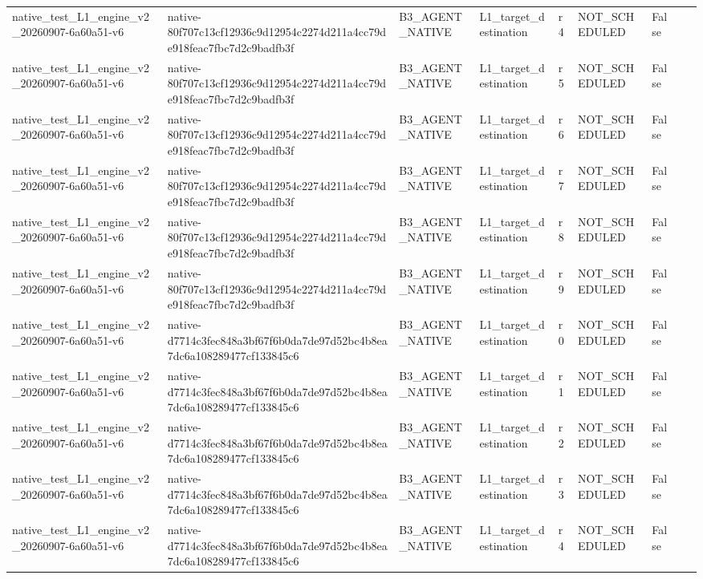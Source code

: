 \begin{tabular}{lllllllll}
native\_test\_L1\_engine\_v2\_20260907-6a60a51-v6 & native-80f707c13cf12936c9d12954c2274d211a4cc79de918feac7fbc7d2c9badfb3f & B3\_AGENT\_NATIVE & L1\_target\_destination & r4 & NOT\_SCHEDULED & False &  &  \\
native\_test\_L1\_engine\_v2\_20260907-6a60a51-v6 & native-80f707c13cf12936c9d12954c2274d211a4cc79de918feac7fbc7d2c9badfb3f & B3\_AGENT\_NATIVE & L1\_target\_destination & r5 & NOT\_SCHEDULED & False &  &  \\
native\_test\_L1\_engine\_v2\_20260907-6a60a51-v6 & native-80f707c13cf12936c9d12954c2274d211a4cc79de918feac7fbc7d2c9badfb3f & B3\_AGENT\_NATIVE & L1\_target\_destination & r6 & NOT\_SCHEDULED & False &  &  \\
native\_test\_L1\_engine\_v2\_20260907-6a60a51-v6 & native-80f707c13cf12936c9d12954c2274d211a4cc79de918feac7fbc7d2c9badfb3f & B3\_AGENT\_NATIVE & L1\_target\_destination & r7 & NOT\_SCHEDULED & False &  &  \\
native\_test\_L1\_engine\_v2\_20260907-6a60a51-v6 & native-80f707c13cf12936c9d12954c2274d211a4cc79de918feac7fbc7d2c9badfb3f & B3\_AGENT\_NATIVE & L1\_target\_destination & r8 & NOT\_SCHEDULED & False &  &  \\
native\_test\_L1\_engine\_v2\_20260907-6a60a51-v6 & native-80f707c13cf12936c9d12954c2274d211a4cc79de918feac7fbc7d2c9badfb3f & B3\_AGENT\_NATIVE & L1\_target\_destination & r9 & NOT\_SCHEDULED & False &  &  \\
native\_test\_L1\_engine\_v2\_20260907-6a60a51-v6 & native-d7714c3fec848a3bf67f6b0da7de97d52bc4b8ea7dc6a108289477cf133845c6 & B3\_AGENT\_NATIVE & L1\_target\_destination & r0 & NOT\_SCHEDULED & False &  &  \\
native\_test\_L1\_engine\_v2\_20260907-6a60a51-v6 & native-d7714c3fec848a3bf67f6b0da7de97d52bc4b8ea7dc6a108289477cf133845c6 & B3\_AGENT\_NATIVE & L1\_target\_destination & r1 & NOT\_SCHEDULED & False &  &  \\
native\_test\_L1\_engine\_v2\_20260907-6a60a51-v6 & native-d7714c3fec848a3bf67f6b0da7de97d52bc4b8ea7dc6a108289477cf133845c6 & B3\_AGENT\_NATIVE & L1\_target\_destination & r2 & NOT\_SCHEDULED & False &  &  \\
native\_test\_L1\_engine\_v2\_20260907-6a60a51-v6 & native-d7714c3fec848a3bf67f6b0da7de97d52bc4b8ea7dc6a108289477cf133845c6 & B3\_AGENT\_NATIVE & L1\_target\_destination & r3 & NOT\_SCHEDULED & False &  &  \\
native\_test\_L1\_engine\_v2\_20260907-6a60a51-v6 & native-d7714c3fec848a3bf67f6b0da7de97d52bc4b8ea7dc6a108289477cf133845c6 & B3\_AGENT\_NATIVE & L1\_target\_destination & r4 & NOT\_SCHEDULED & False &  &  \\

\end{tabular}
